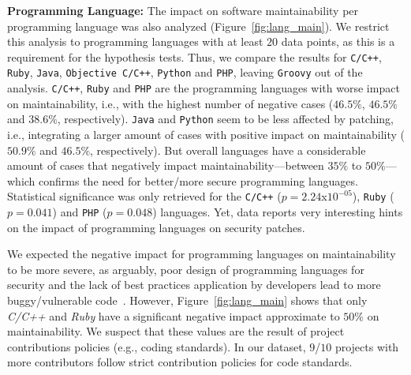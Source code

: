\documentclass[smallextended]{svjour3}       %
\begin{document}
\textbf{Programming Language:} The impact on software maintainability per programming 
language was also analyzed (Figure~\ref{fig:lang_main}). We restrict 
this analysis to programming languages with at least $20$ data points, as this 
is a requirement for the hypothesis tests. Thus, we compare the results for 
\texttt{C/C++}, \texttt{Ruby}, \texttt{Java}, \texttt{Objective C/C++}, 
\texttt{Python} and \texttt{PHP}, leaving \texttt{Groovy} out of the analysis.
\texttt{C/C++}, \texttt{Ruby} and 
\texttt{PHP} are the programming languages with worse 
impact on maintainability, i.e., with the highest number of negative cases ($46.5\%$, $46.5\%$ 
and $38.6\%$, respectively). \texttt{Java} and \texttt{Python} 
seem to be less affected by patching, i.e., integrating a larger amount of cases with positive 
impact on maintainability ($50.9\%$ and $46.5\%$, respectively). But overall 
languages have a considerable amount of cases that negatively impact maintainability---between $35\%$ to $50\%$---which 
confirms the need for better/more secure programming languages. 
Statistical significance was only retrieved for the \texttt{C/C++} 
($p = 2.24$x$10^{-05}$), \texttt{Ruby} ($p = 0.041$) and \texttt{PHP} 
($p = 0.048$) languages. Yet, data reports very interesting hints on the impact 
of programming languages on security patches.

We expected the negative impact for programming languages on
maintainability to be more severe, as arguably, poor design of programming
languages for security and the lack of best practices application by developers lead to more buggy/vulnerable
code~\cite{Ray:2017:LSP:3144574.3126905,2019arXiv190110220B}. However,
Figure~\ref{fig:lang_main} shows that only \emph{C/C++} and \emph{Ruby} have 
a significant negative impact approximate to $50\%$ on 
maintainability. We suspect that these values are
the result of project contributions policies (e.g., coding standards). In our dataset, 
$9$/$10$ projects with more contributors follow strict contribution 
policies for code standards. %
\end{document}
